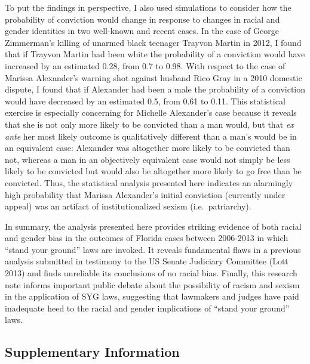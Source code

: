 \documentclass[12pt,article]{article}
\begin{document}
To put the findings in perspective, I also used simulations to consider
how the probability of conviction would change in response to changes in
racial and gender identities in two well-known and recent cases. In the
case of George Zimmerman's killing of unarmed black teenager Trayvon
Martin in 2012, I found that if Trayvon Martin had been white the
probability of a conviction would have increased by an estimated 0.28,
from 0.7 to 0.98. With respect to the case of Marissa Alexander's
warning shot against husband Rico Gray in a 2010 domestic dispute, I
found that if Alexander had been a male the probability of a conviction
would have decreased by an estimated 0.5, from 0.61 to 0.11. This
statistical exercise is especially concerning for Michelle Alexander's
case because it reveals that she is not only more likely to be convicted
than a man would, but that \emph{ex ante} her most likely outcome is
qualitatively different than a man's would be in an equivalent case:
Alexander was altogether more likely to be convicted than not, whereas a
man in an objectively equivalent case would not simply be less likely to
be convicted but would also be altogether more likely to go free than be
convicted. Thus, the statistical analysis presented here indicates an
alarmingly high probability that Marissa Alexander's initial conviction
(currently under appeal) was an artifact of institutionalized sexism
(i.e.~patriarchy).

In summary, the analysis presented here provides striking evidence of
both racial and gender bias in the outcomes of Florida cases between
2006-2013 in which ``stand your ground'' laws are invoked. It reveals
fundamental flaws in a previous analysis submitted in testimony to the
US Senate Judiciary Committee (Lott 2013) and finds unreliable its
conclusions of no racial bias. Finally, this research note informs
important public debate about the possibility of racism and sexism in
the application of SYG laws, suggesting that lawmakers and judges have
paid inadequate heed to the racial and gender implications of ``stand
your ground'' laws.

\clearpage

\subsection{Supplementary Information}\label{supplementary-information}
\end{document}
